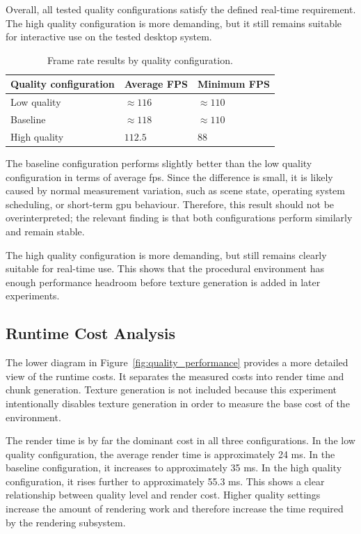 Overall, all tested quality configurations satisfy the defined real-time requirement. The high quality configuration is more demanding, but it still remains suitable for interactive use on the tested desktop system.

\begin{table}[H]
    \centering
    \caption{Frame rate results by quality configuration.}
    \label{tab:quality_fps_results}
    \begin{tabularx}{\textwidth}{|X|X|X|}
    \hline
    \textbf{Quality configuration} & \textbf{Average FPS} & \textbf{Minimum FPS} \\
    \hline
    \hline
    Low quality & $\approx 116$ & $\approx 110$ \\
    \hline
    Baseline & $\approx 118$ & $\approx 110$ \\
    \hline
    High quality & $112.5$ & $88$ \\
    \hline
    \end{tabularx}
\end{table}

The baseline configuration performs slightly better than the low quality configuration in terms of average \gls{fps}. Since the difference is small, it is likely caused by normal measurement variation, such as scene state, operating system scheduling, or short-term \gls{gpu} behaviour. Therefore, this result should not be overinterpreted; the relevant finding is that both configurations perform similarly and remain stable.

The high quality configuration is more demanding, but still remains clearly suitable for real-time use. This shows that the procedural environment has enough performance headroom before texture generation is added in later experiments.

\subsection{Runtime Cost Analysis}

The lower diagram in Figure~\ref{fig:quality_performance} provides a more detailed view of the runtime costs. It separates the measured costs into render time and chunk generation. Texture generation is not included because this experiment intentionally disables texture generation in order to measure the base cost of the environment.

The render time is by far the dominant cost in all three configurations. In the low quality configuration, the average render time is approximately 24 ms. In the baseline configuration, it increases to approximately 35 ms. In the high quality configuration, it rises further to approximately 55.3 ms. This shows a clear relationship between quality level and render cost. Higher quality settings increase the amount of rendering work and therefore increase the time required by the rendering subsystem.

